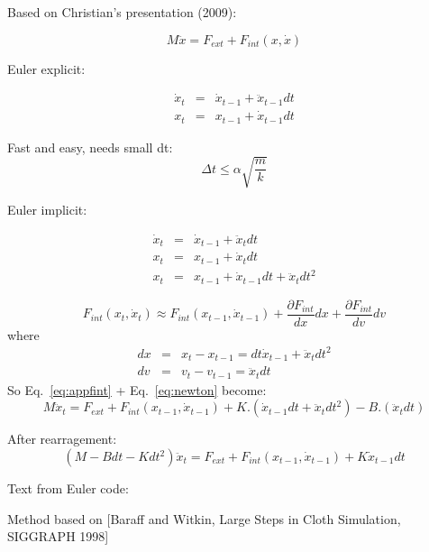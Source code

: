 \documentclass[9pt]{article}
\begin{document}
{\Large Based on Christian's presentation (2009)}:

\begin{equation}
M \ddot{x} = F_{ext} + F_{int}(x,\dot{x})
\label{eq:newton}
\end{equation}

Euler explicit:

\begin{eqnarray}
\dot{x}_t & = & \dot{x}_{t-1} + \ddot{x}_{t-1} dt \\
x_t & = & x_{t-1} + \dot{x}_{t-1} dt
\end{eqnarray}

Fast and easy, needs small dt:   
\begin{equation}
\Delta t \leq \alpha\sqrt{\frac{m}{k}}
\end{equation}


Euler implicit: 

\begin{eqnarray}
\dot{x}_t & = & \dot{x}_{t-1} + \ddot{x}_t dt \\
x_t & = & x_{t-1} + \dot{x}_t dt \\
x_t & = & x_{t-1} + \dot{x}_{t-1}dt + \ddot{x}_t dt^2
\end{eqnarray}

\begin{equation}
F_{int}(x_{t}, \dot{x}_t) \approx F_{int}(x_{t-1}, \dot{x}_{t-1}) + \frac{\partial F_{int}}{dx}dx + \frac{\partial F_{int}}{dv} dv
\label{eq:appfint}
\end{equation}
where
\begin{eqnarray}
dx & = & x_t - x_{t-1} = dt\dot{x}_{t-1} + \ddot{x}_t dt^2 \\
dv & = & v_t - v_{t-1} = \ddot{x}_t dt
\end{eqnarray}
So Eq.~\ref{eq:appfint} + Eq.~\ref{eq:newton} become:
\begin{equation}
M\ddot{x}_t = F_{ext} + F_{int}(x_{t-1},\dot{x}_{t-1}) + K.(\dot{x}_{t-1}dt + \ddot{x}_t dt^2) - B.(\ddot{x}_t dt)
\end{equation}

After rearragement:
\begin{equation}
(M - Bdt - Kdt^2)\ddot{x}_t = F_{ext} +  F_{int} (x_{t-1},\dot{x}_{t-1}) +  K\dot{x}_{t-1}dt
\end{equation}


\newpage
{\Large Text from Euler code:}

 Method based on [Baraff and Witkin, Large Steps in Cloth Simulation, SIGGRAPH 1998]
\end{document}
